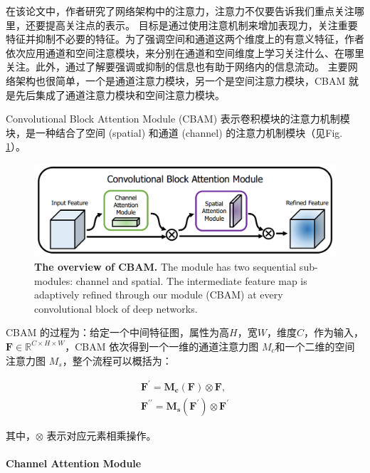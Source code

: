 \documentclass[a4paper, 10pt]{article}
\begin{document}
		在该论文中，作者研究了网络架构中的注意力，注意力不仅要告诉我们重点关注哪里，还要提高关注点的表示。 目标是通过使用注意机制来增加表现力，关注重要特征并抑制不必要的特征。为了强调空间和通道这两个维度上的有意义特征，作者依次应用通道和空间注意模块，来分别在通道和空间维度上学习关注什么、在哪里关注。此外，通过了解要强调或抑制的信息也有助于网络内的信息流动。
		主要网络架构也很简单，一个是通道注意力模块，另一个是空间注意力模块，CBAM 就是先后集成了通道注意力模块和空间注意力模块。
		
		Convolutional Block Attention Module (CBAM) 表示卷积模块的注意力机制模块，是一种结合了空间 (spatial) 和通道 (channel) 的注意力机制模块（见Fig. \ref{fig: CBAM-overview}）。
		
		\begin{figure}[htbp]
			\centering 
			\includegraphics[width=0.7\columnwidth]{picture/LLIE/CBAM/CBAM-overview}
			\caption{
				\label{fig: CBAM-overview} 
				\textbf{The overview of CBAM.} The module has two sequential sub-modules:
				channel and spatial. The intermediate feature map is adaptively refined through
				our module (CBAM) at every convolutional block of deep networks.
			}
		\end{figure}
		
		CBAM 的过程为：给定一个中间特征图，属性为高$H$，宽$W$，维度$C$，作为输入，$\mathbf{F} \in \mathbb{R}^{C \times H \times W}$，CBAM 依次得到一个一维的通道注意力图 $M_c$和一个二维的空间注意力图 $M_s$，整个流程可以概括为： 
		
		\begin{equation}
			\begin{aligned}
				\mathbf{F}^{\prime} = \mathbf{M_c}(\mathbf{F}) \otimes \mathbf{F}, \\
				\mathbf{F}^{\prime\prime} = \mathbf{M_s}(\mathbf{F}^{\prime}) \otimes \mathbf{F}^{\prime}
			\end{aligned}
			\label{eq: CBAM}
		\end{equation}
		
		其中，$\otimes$ 表示对应元素相乘操作。
		
		\paragraph{Channel Attention Module}
		
\end{document}
